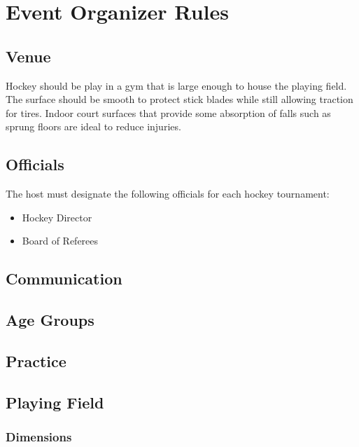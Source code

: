 \chapter{Event Organizer Rules}

\section{Venue}

Hockey should be play in a gym that is large enough to house the playing field.
The surface should be smooth to protect stick blades while still allowing traction for tires.
Indoor court surfaces that provide some absorption of falls such as sprung floors are ideal to reduce injuries.

\section{Officials}

The host must designate the following officials for each hockey tournament:
\begin{itemize}
\item Hockey Director
\item Board of Referees
\end{itemize}

\begin{comment2016}

\section{Communication}

\section{Age Groups}

\section{Practice}

\end{comment2016}

\section{Playing Field}

\subsection{Dimensions}

